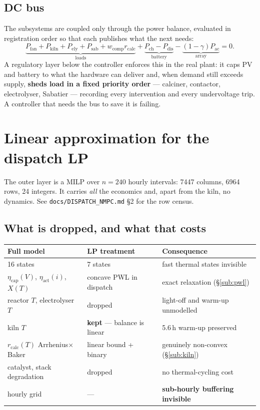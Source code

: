 \documentclass[11pt,a4paper]{article}
\begin{document}
\subsection{DC bus}

The subsystems are coupled only through the power balance, evaluated in
registration order so that each publishes what the next needs:
\begin{equation}
\underbrace{P_{\text{fan}} + P_{\text{kiln}} + P_{\text{ely}} + P_{\text{sab}}
 + w_{\text{comp}} r_{\text{calc}}}_{\text{loads}}
 + \underbrace{P_{\text{ch}} - P_{\text{dis}}}_{\text{battery}}
 - \underbrace{(1-\gamma)P_{\text{ac}}}_{\text{array}} = 0 .
\end{equation}
A regulatory layer below the controller enforces this in the real plant: it caps
PV and battery to what the hardware can deliver and, when demand still exceeds
supply, \textbf{sheds load in a fixed priority order} --- calciner, contactor,
electrolyser, Sabatier --- recording every intervention and every undervoltage
trip. A controller that needs the bus to save it is failing.

\section{Linear approximation for the dispatch LP}
\label{sec:lp}

The outer layer is a MILP over $n = 240$ hourly intervals: 7447 columns, 6964
rows, 24 integers. It carries \emph{all} the economics and, apart from the kiln,
no dynamics. See \texttt{docs/DISPATCH\_NMPC.md} \S2 for the row census.

\subsection{What is dropped, and what that costs}

\begin{center}\small
\begin{tabular}{lll}
\toprule
\textbf{Full model} & \textbf{LP treatment} & \textbf{Consequence}\\
\midrule
16 states & 7 states & fast thermal states invisible\\
$\eta_{\text{cap}}(V)$, $\eta_{\text{act}}(i)$, $X(T)$ & concave PWL in dispatch & exact relaxation (\S\ref{sub:pwl})\\
reactor $T$, electrolyser $T$ & dropped & light-off and warm-up unmodelled\\
kiln $T$ & \textbf{kept} --- balance is linear & 5.6\,h warm-up preserved\\
$r_{\text{calc}}(T)$ Arrhenius$\times$Baker & linear bound + binary & genuinely non-convex (\S\ref{sub:kiln})\\
catalyst, stack degradation & dropped & no thermal-cycling cost\\
hourly grid & --- & \textbf{sub-hourly buffering invisible}\\
\bottomrule
\end{tabular}
\end{center}
\end{document}
